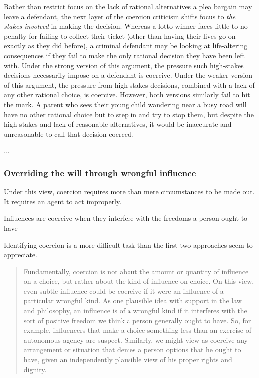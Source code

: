 Rather than restrict focus on the lack of rational alternatives a plea bargain may leave a defendant, the next layer of the coercion criticism shifts focus to \textit{the stakes involved} in making the decision. Whereas a lotto winner faces little to no penalty for failing to collect their ticket (other than having their lives go on exactly as they did before), a criminal defendant may be looking at life-altering consequences if they fail to make the only rational decision they have been left with. Under the strong version of this argument, the pressure such high-stakes decisions necessarily impose on a defendant is coercive. Under the weaker version of this argument, the pressure from high-stakes decisions, combined with a lack of any other rational choice, is coercive. However, both versions similarly fail to hit the mark. A parent who sees their young child wandering near a busy road will have no other rational choice but to step in and try to stop them, but despite the high stakes and lack of reasonable alternatives, it would be inaccurate and unreasonable to call that decision coerced. 

... 

\subsubsection{Overriding the will through wrongful influence}

Under this view, coercion requires more than mere circumstances to be made out. It requires an agent to act improperly. 

Influences are coercive when they interfere with the freedoms a person ought to have

Identifying coercion is a more difficult task than the first two approaches seem to appreciate.
\begin{quote}
    Fundamentally, coercion is not about the amount or quantity of influence on a choice, but rather about the kind of influence on \textbf{}choice. On this view, even subtle influence could be coercive if it were an influence of a particular wrongful kind. As one plausible idea with support in the law and philosophy, an influence is of a wrongful kind if it interferes with the sort of positive freedom we think a person generally ought to have. So, for example, influencers that make a choice something less than an exercise of autonomous agency are suspect. Similarly, we might view as coercive any arrangement or situation that denies a person options that he ought to have, given an independently plausible view of his proper rights and dignity.
\end{quote}

